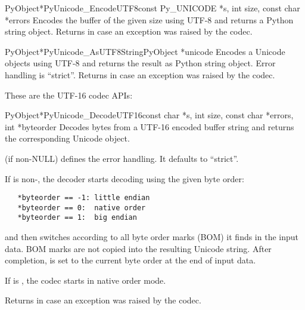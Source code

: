 \documentclass{manual}
\begin{document}
\begin{cfuncdesc}{PyObject*}{PyUnicode_EncodeUTF8}{const Py_UNICODE *s,
                                               int size,
                                               const char *errors}
Encodes the  buffer of the given size using UTF-8
and returns a Python string object.  Returns \NULL{} in case an
exception was raised by the codec.
\end{cfuncdesc}

\begin{cfuncdesc}{PyObject*}{PyUnicode_AsUTF8String}{PyObject *unicode}
Encodes a Unicode objects using UTF-8 and returns the result as Python
string object. Error handling is ``strict''. Returns
\NULL{} in case an exception was raised by the codec.
\end{cfuncdesc}


These are the UTF-16 codec APIs:

\begin{cfuncdesc}{PyObject*}{PyUnicode_DecodeUTF16}{const char *s,
                                               int size,
                                               const char *errors,
                                               int *byteorder}
Decodes  bytes from a UTF-16 encoded buffer string and
returns the corresponding Unicode object.

 (if non-NULL) defines the error handling. It defaults
to ``strict''.

If  is non-\NULL{}, the decoder starts decoding using
the given byte order:

\begin{verbatim}
   *byteorder == -1: little endian
   *byteorder == 0:  native order
   *byteorder == 1:  big endian
\end{verbatim}

and then switches according to all byte order marks (BOM) it finds in
the input data. BOM marks are not copied into the resulting Unicode
string.  After completion,  is set to the current byte
order at the end of input data.

If  is \NULL{}, the codec starts in native order mode.

Returns \NULL{} in case an exception was raised by the codec.
\end{cfuncdesc}
\end{document}
